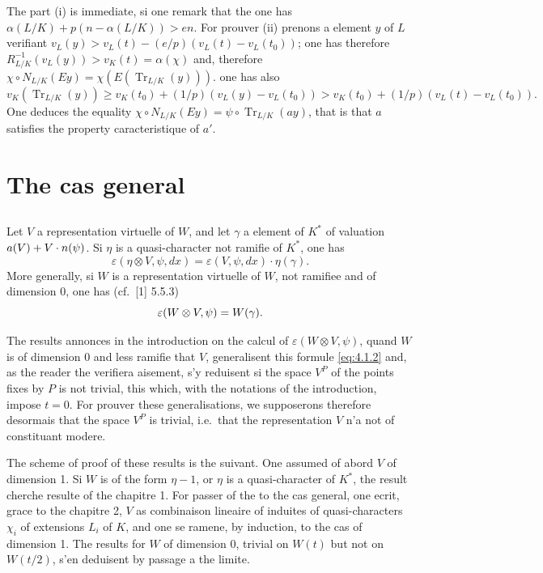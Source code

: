 \documentclass[12pt,a4paper]{article}
\theoremstyle{plain}
\theoremstyle{definition}
\theoremstyle{remark}
\DeclareMathOperator{\Tr}{Tr}
\let\dim\relax\let\det\relax
\providecommand{\Tr}{\operatorname{Tr}}
\begin{document}
The part (i) is immediate, si one remark that the one has $\alpha(L/K) + p(n - \alpha(L/K)) > en$. For prouver (ii) prenons a element $y$ of $L$ verifiant $v_L(y) > v_L(t) - (e/p)(v_L(t) - v_L(t_0))$; one has therefore $R_{L/K}^{-1}(v_L(y)) > v_K(t) = \alpha(\chi)$ and, therefore $\chi \circ N_{L/K}(Ey) = \chi(E(\Tr_{L/K}(y)))$. one has also
\[
v_K(\Tr_{L/K}(y)) \geq v_K(t_0) + (1/p)(v_L(y) - v_L(t_0)) > v_K(t_0) + (1/p)(v_L(t) - v_L(t_0)).
\]
One deduces the equality $\chi \circ N_{L/K}(Ey) = \psi \circ \Tr_{L/K}(ay)$, that is that $a$ satisfies the property caracteristique of $a'$.


\section{The cas general}
\label{sec:4}

\subsection{}
\label{sec:4.1}

Let $V$ a representation virtuelle of $W$, and let $\gamma$ a element of $K^*$ of valuation $a(V) + \dim V \cdot n(\psi)$.
Si $\eta$ is a quasi-character not ramifie of $K^*$, one has
\begin{equation}\label{eq:4.1.1}
\varepsilon(\eta \otimes V, \psi, dx) = \varepsilon(V, \psi, dx) \cdot \eta(\gamma).
\end{equation}
More generally, si $W$ is a representation virtuelle of $W$, not ramifiee and of dimension 0, one has (cf.~[1] 5.5.3)
\begin{equation}\label{eq:4.1.2}
\varepsilon(W \otimes V, \psi) = \det W(\gamma).
\end{equation}

The results annonces in the introduction on the calcul of $\varepsilon(W \otimes V, \psi)$, quand $W$ is of dimension 0 and less ramifie that $V$, generalisent this formule \eqref{eq:4.1.2} and, as the reader the verifiera aisement, s'y reduisent si the space $V^P$ of the points fixes by $P$ is not trivial, this which, with the notations of the introduction, impose $t=0$. For prouver these generalisations, we supposerons therefore desormais that the space $V^P$ is trivial, i.e.~that the representation $V$ n'a not of constituant modere.

The scheme of proof of these results is the suivant. One assumed of abord $V$ of dimension 1. Si $W$ is of the form $\eta - 1$, or $\eta$ is a quasi-character of $K^*$, the result cherche resulte of the chapitre 1. For passer of the to the cas general, one ecrit, grace to the chapitre 2, $V$ as combinaison lineaire of induites of quasi-characters $\chi_i$ of extensions $L_i$ of $K$, and one se ramene, by induction, to the cas of dimension 1. The results for $W$ of dimension 0, trivial on $W(t)$ but not on $W(t/2)$, s'en deduisent by passage a the limite.
\end{document}
